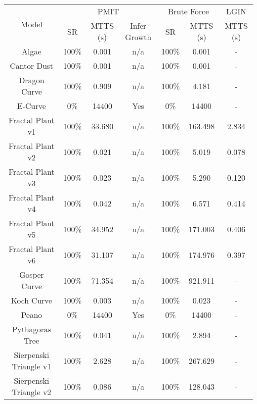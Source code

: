 \documentclass{llncs}
\begin{document}
	\begin{table}[h!]
		\centering
		\begin{tabular}{|c||c|c|c||c|c||c|}
			\hline
			\multirow{2}{*}{Model} & \multicolumn{3}{c||}{PMIT} & \multicolumn{2}{c|}{Brute Force} & LGIN \cite{nakano_inferD0Lerrorfree} \\ \cline{2-7}
			& SR & MTTS (s) & Infer Growth & SR & MTTS (s) & MTTS (s) \\ \hline
			Algae \cite{beauty}& 100\% & 0.001 & n/a & 100\% & 0.001 & - \\ \hline
			Cantor Dust \cite{beauty}& 100\% & 0.001 & n/a & 100\% & 0.001 & - \\ \hline
			Dragon Curve \cite{beauty}& 100\% & 0.909 & n/a & 100\% & 4.181 & - \\ \hline
			E-Curve \cite{beauty}& 0\% & 14400 & Yes & 0\% & 14400 & - \\ \hline
			Fractal Plant v1 \cite{beauty,nakano_inferD0Lerrorfree} & 100\% & 33.680 & n/a & 100\% & 163.498 & 2.834 \\ \hline
			Fractal Plant v2 \cite{beauty,nakano_inferD0Lerrorfree} & 100\% & 0.021 & n/a & 100\% & 5.019 & 0.078 \\ \hline
			Fractal Plant v3 \cite{beauty,nakano_inferD0Lerrorfree} & 100\% & 0.023 & n/a & 100\% & 5.290 & 0.120 \\ \hline
			Fractal Plant v4 \cite{beauty,nakano_inferD0Lerrorfree} & 100\% & 0.042 & n/a & 100\% & 6.571 & 0.414 \\ \hline
			Fractal Plant v5 \cite{beauty,nakano_inferD0Lerrorfree} & 100\% & 34.952 & n/a & 100\% & 171.003 & 0.406 \\ \hline
			Fractal Plant v6 \cite{beauty,nakano_inferD0Lerrorfree} & 100\% & 31.107 & n/a & 100\% & 174.976 & 0.397 \\ \hline
			Gosper Curve \cite{beauty}& 100\% & 71.354 & n/a& 100\% & 921.911 & - \\ \hline
			Koch Curve \cite{beauty}& 100\% & 0.003 & n/a& 100\% & 0.023 & - \\ \hline
			Peano \cite{beauty}& 0\% & 14400 & Yes & 0\% & 14400 & - \\ \hline
			Pythagoras Tree \cite{beauty}& 100\% & 0.041 & n/a & 100\% & 2.894 & - \\ \hline
			Sierpenski Triangle v1 \cite{beauty}& 100\% & 2.628 & n/a & 100\% & 267.629 & - \\ \hline
			Sierpenski Triangle v2 \cite{beauty}& 100\% & 0.086 & n/a & 100\% & 128.043 & - \\ \hline

\end{tabular}
\end{table}
\end{document}

